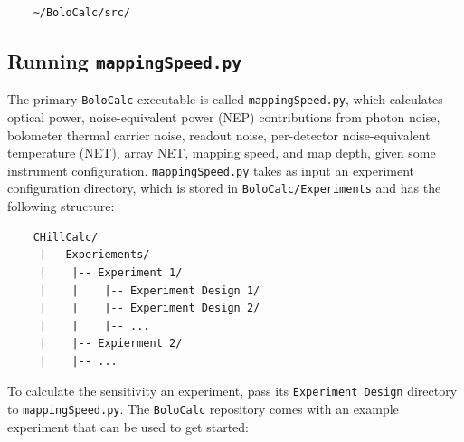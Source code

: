 \documentclass[11pt]{article} %
\begin{document}
\begin{lstlisting}
	~/BoloCalc/src/
\end{lstlisting}


\subsection{Running \texttt{mappingSpeed.py}}
\label{sec:runms}

The primary \texttt{BoloCalc} executable is called \texttt{mappingSpeed.py}, which calculates optical power, noise-equivalent power (NEP) contributions from photon noise, bolometer thermal carrier noise, readout noise, per-detector noise-equivalent temperature (NET), array NET, mapping speed, and map depth, given some instrument configuration. \texttt{mappingSpeed.py} takes as input an experiment configuration directory, which is stored in \texttt{BoloCalc/Experiments} and has the following structure:

\begin{lstlisting}
	CHillCalc/
	 |-- Experiements/
	 |    |-- Experiment 1/
	 |    |    |-- Experiment Design 1/
	 |    |    |-- Experiment Design 2/
	 |    |    |-- ...
	 |    |-- Expierment 2/
	 |    |-- ...
\end{lstlisting}
			
To calculate the sensitivity an experiment, pass its \texttt{Experiment Design} directory to \texttt{mappingSpeed.py}. The \texttt{BoloCalc} repository comes with an example  experiment that can be used to get started: 
\end{document}
